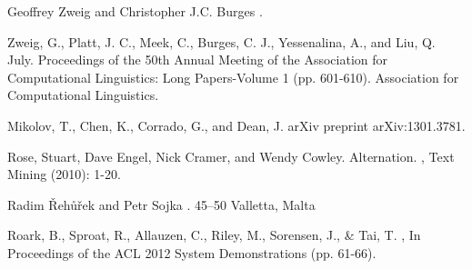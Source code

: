 \documentclass[11pt]{article}
\begin{document}
\begin{thebibliography}{}

Geoffrey Zweig and Christopher J.C. Burges
.

Zweig, G., Platt, J. C., Meek, C., Burges, C. J., Yessenalina, A., and Liu, Q. 
 July.
\newblock Proceedings of the 50th Annual Meeting of the Association for Computational Linguistics: Long Papers-Volume 1 (pp. 601-610). Association for Computational Linguistics.

Mikolov, T., Chen, K., Corrado, G., and Dean, J.
\newblock arXiv preprint arXiv:1301.3781.

Rose, Stuart, Dave Engel, Nick Cramer, and Wendy Cowley.
\newblock Alternation.
,
\newblock Text Mining (2010): 1-20.

Radim {\v R}eh{\r u}{\v r}ek and Petr Sojka
. 45--50
\newblock Valletta, Malta

Roark, B., Sproat, R., Allauzen, C., Riley, M., Sorensen, J., \& Tai, T.
,
\newblock  In Proceedings of the ACL 2012 System Demonstrations (pp. 61-66).

\end{thebibliography}
\end{document}
